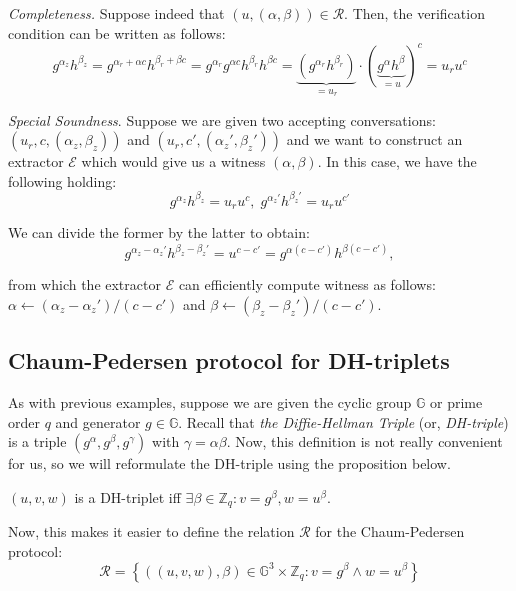 \documentclass[../lecture-notes.tex]{subfiles}
\begin{document}
\textit{Completeness.} Suppose indeed that $(u,(\alpha,\beta)) \in \mathcal{R}$. Then, the verification condition can be written as follows:
\begin{equation*}
    g^{\alpha_z}h^{\beta_z} = g^{\alpha_r + \alpha c}h^{\beta_r + \beta c} = g^{\alpha_r}g^{\alpha c}h^{\beta_r}h^{\beta c} = \underbrace{(g^{\alpha_r}h^{\beta_r})}_{=u_r} \cdot (\underbrace{g^{\alpha}h^{\beta}}_{=u})^c = u_r u^c
\end{equation*}

\textit{Special Soundness}. Suppose we are given two accepting conversations: $(u_r,c,(\alpha_z,\beta_z))$ and $(u_r,c',(\alpha_z',\beta_z'))$ and we want to construct an extractor $\mathcal{E}$ which would give us a witness $(\alpha,\beta)$. In this case, we have the following holding:
\begin{equation*}
    g^{\alpha_z}h^{\beta_z} = u_r u^c, \; g^{\alpha_z'}h^{\beta_z'} = u_r u^{c'}
\end{equation*}

We can divide the former by the latter to obtain:
\begin{equation*}
    g^{\alpha_z - \alpha_z'}h^{\beta_z - \beta_z'} = u^{c-c'} = g^{\alpha(c-c')}h^{\beta(c-c')},
\end{equation*}

from which the extractor $\mathcal{E}$ can efficiently compute witness as follows: $\alpha \gets (\alpha_z - \alpha_z')\big/(c-c')$ and $\beta \gets (\beta_z - \beta_z')\big/(c-c')$.

\subsection{Chaum-Pedersen protocol for DH-triplets}

As with previous examples, suppose we are given the cyclic group $\mathbb{G}$ or prime order $q$ and generator $g \in \mathbb{G}$. Recall that \textit{the Diffie-Hellman Triple} (or, \textit{DH-triple}) is a triple $(g^{\alpha},g^{\beta},g^{\gamma})$ with $\gamma=\alpha\beta$. Now, this definition is not really convenient for us, so we will reformulate the DH-triple using the proposition below.

\begin{proposition}
    $(u,v,w)$ is a DH-triplet iff $\exists \beta \in \mathbb{Z}_q: v = g^{\beta}, w = u^{\beta}$.
\end{proposition}

Now, this makes it easier to define the relation $\mathcal{R}$ for the Chaum-Pedersen protocol:
\begin{equation*}
    \mathcal{R} = \left\{ ((u,v,w), \beta) \in \mathbb{G}^3 \times \mathbb{Z}_q: v = g^{\beta} \wedge w = u^{\beta} \right\}
\end{equation*}
\end{document}
